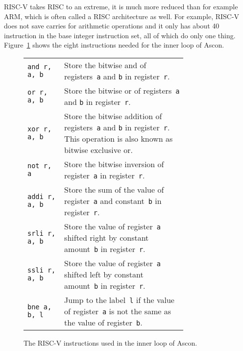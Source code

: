 RISC-V takes RISC to an extreme, it is much more reduced than for example ARM,
which is often called a RISC architecture as well. For example, RISC-V does not
save carries for arithmetic operations and it only has about 40 instruction in
the base integer instruction set, all of which do only one thing.
Figure~\ref{opcodes} shows the eight instructions needed for the inner loop of
Ascon.

\begin{figure}
\begin{tabular}{l p{0.77\linewidth}}
       \texttt{and r, a, b} & Store the bitwise and of registers~\texttt{a} and
        \texttt{b} in register~\texttt{r}.
    \\ \texttt{or r, a, b} & Store the bitwise or of registers~\texttt{a} and
        \texttt{b} in register~\texttt{r}.
    \\ \texttt{xor r, a, b} & Store the bitwise addition of registers~\texttt{a}
        and \texttt{b} in register~\texttt{r}. This operation is also known as
        bitwise exclusive or.
    \\ \texttt{not r, a} & Store the bitwise inversion of register~\texttt{a} in
        register~\texttt{r}.
    \\ \texttt{addi r, a, b} & Store the sum of the value of register~\texttt{a}
        and constant~\texttt{b} in register~\texttt{r}.
    \\ \texttt{srli r, a, b} & Store the value of register~\texttt{a} shifted
        right by constant amount~\texttt{b} in register~\texttt{r}.
    \\ \texttt{ssli r, a, b} & Store the value of register~\texttt{a} shifted
        left by constant amount~\texttt{b} in register~\texttt{r}.
    \\ \texttt{bne a, b, l} & Jump to the label~\texttt{l} if the value of
        register~\texttt{a} is not the same as the value of register~\texttt{b}.
\end{tabular}

\caption{The RISC-V instructions used in the inner loop of Ascon.}

\label{opcodes}
\end{figure}
